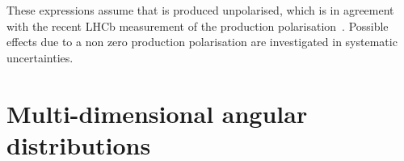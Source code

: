 %
%


These expressions assume that \Lb is produced unpolarised, which is in agreement with the recent LHCb
measurement of the production polarisation~\cite{LHCb-PAPER-2012-057}.
Possible effects due to a non zero production polarisation are investigated in systematic uncertainties.


\section{Multi-dimensional angular distributions}

